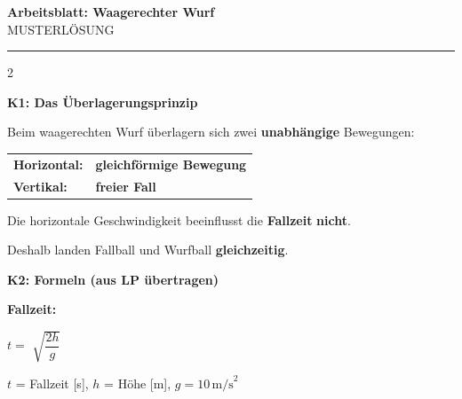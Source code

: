 \documentclass[10pt, a4paper]{article}
\newcommand{\fachfarbe}{physik}
\newcommand{\thema}{Waagerechter Wurf}
\newcommand{\ph}[1]{\textcolor{\fachfarbe}{\textbf{#1}}}
\newcommand{\lsg}[1]{\textcolor{loesung}{\textbf{#1}}}
\newcommand{\abschnitt}[1]{%
    \vspace{4pt}
    \noindent\textbf{\textcolor{\fachfarbe}{#1}}
    \vspace{2pt}
}
\begin{document}
\begin{center}
{\large\bfseries Arbeitsblatt: \thema}\\[2pt]
{\small\textcolor{loesung}{MUSTERLÖSUNG}}
\end{center}

\vspace{-4pt}
\hrule
\vspace{4pt}


\begin{multicols}{2}
\small


\abschnitt{K1: Das Überlagerungsprinzip}

\begin{merkbox}[Merksatz]
Beim waagerechten Wurf überlagern sich zwei \ph{unabhängige} Bewegungen:

\vspace{4pt}
\begin{tabular}{@{}p{2cm}l@{}}
\textbf{Horizontal:} & \lsg{gleichförmige Bewegung} \\[8pt]
\textbf{Vertikal:} & \lsg{freier Fall} \\
\end{tabular}

\vspace{6pt}
Die horizontale Geschwindigkeit beeinflusst die \lsg{Fallzeit} \textbf{nicht}.

\vspace{4pt}
Deshalb landen Fallball und Wurfball \lsg{gleichzeitig}.
\end{merkbox}

\vspace{2pt}


\abschnitt{K2: Formeln (aus LP übertragen)}

\begin{formelbox}
\textbf{Fallzeit:}
\vspace{4pt}

$t = $ \lsg{$\sqrt{\dfrac{2h}{g}}$}

\vspace{2pt}
\footnotesize
$t$ = Fallzeit [s], $h$ = Höhe [m], $g = 10\,\text{m/s}^2$
\end{formelbox}


\end{multicols}
\end{document}
